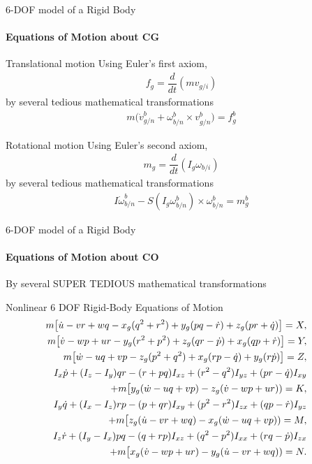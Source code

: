 \begin{frame}{6-DOF model of a Rigid Body}
	\framesubtitle{Equations of Motion about CG}
	
	\begin{block}{Translational motion}
		Using Euler's first axiom,
		\begin{align}
			f_g = \dfrac{d}{dt}(mv_{g/i})
		\end{align}
		by several tedious mathematical transformations
		\begin{align}
			m\Big(\dot{v}_{g/n}^b + \omega_{b/n}^b\times v_{g/n}^b\Big) = f_{g}^b
		\end{align}
	\end{block}
	
	
	\begin{block}{Rotational motion}
		Using Euler's second axiom,
		\begin{align}
			m_g = \dfrac{d}{dt}(I_g\omega_{b/i})
		\end{align}
		by several tedious mathematical transformations
		\begin{align}
			I\dot{\omega}_{b/n}^{b} - S(I_g\omega_{b/n}^b) \times \omega_{b/n}^b = m_{g}^b
		\end{align}
	\end{block}
	
	
\end{frame}




\begin{frame}{6-DOF model of a Rigid Body}
	\framesubtitle{Equations of Motion about CO}
	By several SUPER TEDIOUS mathematical transformations
	\begin{block}{Nonlinear 6 DOF Rigid-Body Equations of Motion}
		\begin{align}
			m \big[\dot{u} - vr + wq - x_g(q^2 + r^2) + y_g(pq - \dot{r}) + z_g(pr + \dot{q})\big] = X, \\
			m \big[\dot{v} - wp + ur - y_g(r^2 + p^2) + z_g(qr - \dot{p}) + x_g(qp + \dot{r}) \big] = Y, \\
			m \big[\dot{w} - uq + vp - z_g(p^2 + q^2) + x_g(rp - \dot{q}) + y_g(r \dot{p})\big] = Z,
			\\
			I_x \dot{p} + (I_z - I_y)qr - (r + pq)I_{xz} + (r^2 - q^2)I_{yz} + (pr - \dot{q})I_{xy} & \notag\\
			+ m \big[ y_g(\dot{w} - uq + vp) - z_g(\dot{v} - wp + ur) )= K, \\
			I_y \dot{q} + (I_x - I_z)rp - (p + qr)I_{xy} + (p^2 - r^2)I_{zx} + (qp - \dot{r})I_{yz} & \notag \\
			+ m \big[ z_g(\dot{u} - vr + wq) - x_g(\dot{w} - uq + vp) ) = M, \\
			I_z \dot{r} + (I_y - I_x)pq - (q + rp)I_{xz} + (q^2 - p^2)I_{xx} + (rq - \dot{p})I_{zx} & \notag \\
			+ m \big[ x_g(\dot{v} - wp + ur) - y_g(\dot{u} - vr + wq)) = N.
		\end{align}
	\end{block}
\end{frame}

